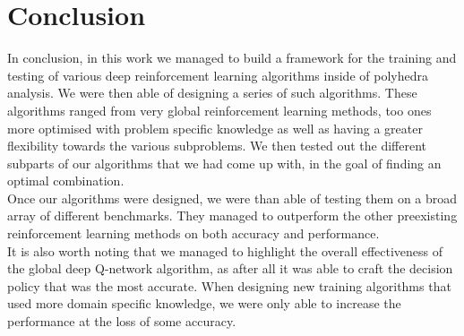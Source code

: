 
\chapter{Conclusion}

In conclusion, in this work we managed to build a framework for the training and testing of various deep reinforcement learning algorithms inside of polyhedra analysis. We were then able of designing a series of such algorithms. These algorithms ranged from very global reinforcement learning methods, too ones more optimised with problem specific knowledge as well as having a greater flexibility towards the various subproblems. We then tested out the different subparts of our algorithms that we had come up with, in the goal of finding an optimal combination.\\
Once our algorithms were designed, we were than able of testing them on a broad array of different benchmarks. They managed to outperform the other preexisting reinforcement learning methods on both accuracy and performance.\\
It is also worth noting that we managed to highlight the overall effectiveness of the global deep Q-network algorithm, as after all it was able to craft the decision policy that was the most accurate. When designing new training algorithms that used more domain specific knowledge, we were only able to increase the performance at the loss of some accuracy.